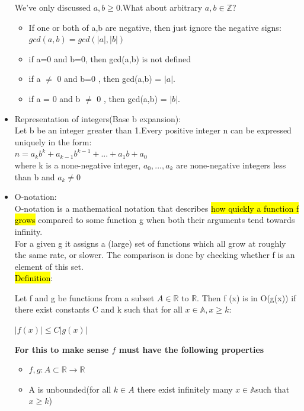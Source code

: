 \documentclass{article}
\begin{document}
\begin{itemize}
We've only discussed $a,b \geq 0$.What about arbitrary $a,b \in \mathbb{Z}$?
\begin{itemize}
\item If one or both of a,b are negative, then just ignore the negative signs: $gcd(a,b) = gcd(|a|,|b|)$
\item if a=0 and b=0, then gcd(a,b) is not defined
\item if a $\neq$ 0 and b=0 , then gcd(a,b) = $|a|$.
\item if a = 0 and b $\neq$ 0 , then gcd(a,b) = $|b|$.
\end{itemize}

\item Representation of integers(Base b expansion):\\
Let b be an integer greater than 1.Every positive integer n can be expressed uniquely in the form:\\
$n = a_kb^k + a_{k-1}b^{k-1} + ... + a_1b + a_0$\\
where k is a none-negative integer, $a_0,...,a_k$ are none-negative integers less than b and $a_k \neq 0$

\item O-notation:\\
O-notation is a mathematical notation that describes \hl{how quickly a
function f grows} compared to some function g when both their arguments
tend towards infinity.\\
For a given g it assigns a (large) set of functions which all grow at roughly
the same rate, or slower. The comparison is done by checking whether f is
an element of this set.\\
\hl{Definition}:

Let f and g be functions from a subset $A \in \mathbb{R}$ to $\mathbb{R}$. Then f (x) is in
O(g(x)) if there exist constants C and k such that for all $x \in \mathbb{A}, x \geq k$:
\begin{center}
$|f(x)| \leq C |g(x)|$
\end{center}

\textbf{For this to make sense $f$ must have the following properties}\\
\begin{itemize}
\item $f,g : A \subset \mathbb{R} \rightarrow \mathbb{R}$
\item A is unbounded(for all $k \in A$ there exist infinitely many $x \in \mathbb{A} $such that $ x \geq k$)
\end{itemize}


\end{itemize}
\end{document}
